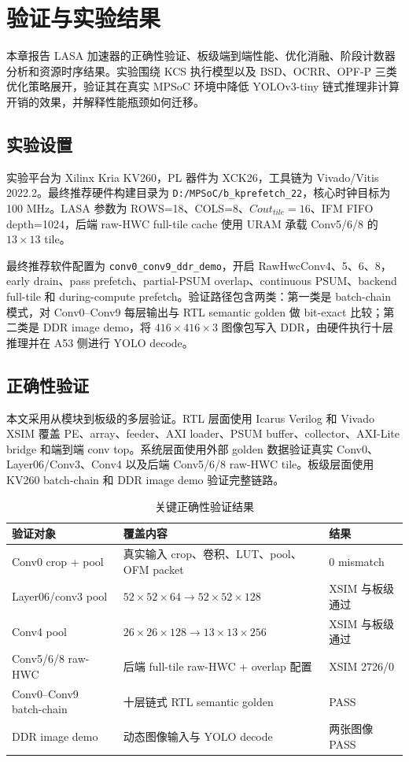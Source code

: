 \chapter{验证与实验结果}
\label{chap:results}

本章报告 LASA 加速器的正确性验证、板级端到端性能、优化消融、阶段计数器分析和资源时序结果。实验围绕 KCS 执行模型以及 BSD、OCRR、OPF-P 三类优化策略展开，验证其在真实 MPSoC 环境中降低 YOLOv3-tiny 链式推理非计算开销的效果，并解释性能瓶颈如何迁移。

\section{实验设置}

实验平台为 Xilinx Kria KV260，PL 器件为 XCK26，工具链为 Vivado/Vitis 2022.2。最终推荐硬件构建目录为 \texttt{D:/MPSoC/b\_kprefetch\_22}，核心时钟目标为 100 MHz。LASA 参数为 ROWS=18、COLS=8、$Cout_{tile}=16$、IFM FIFO depth=1024，后端 raw-HWC full-tile cache 使用 URAM 承载 Conv5/6/8 的 $13\times13$ tile。

最终推荐软件配置为 \texttt{conv0\_conv9\_ddr\_demo}，开启 RawHwcConv4、5、6、8，early drain、pass prefetch、partial-PSUM overlap、continuous PSUM、backend full-tile 和 during-compute prefetch。验证路径包含两类：第一类是 batch-chain 模式，对 Conv0--Conv9 每层输出与 RTL semantic golden 做 bit-exact 比较；第二类是 DDR image demo，将 $416\times416\times3$ 图像包写入 DDR，由硬件执行十层推理并在 A53 侧进行 YOLO decode。

\section{正确性验证}

本文采用从模块到板级的多层验证。RTL 层面使用 Icarus Verilog 和 Vivado XSIM 覆盖 PE、array、feeder、AXI loader、PSUM buffer、collector、AXI-Lite bridge 和端到端 conv top。系统层面使用外部 golden 数据验证真实 Conv0、Layer06/Conv3、Conv4 以及后端 Conv5/6/8 raw-HWC tile。板级层面使用 KV260 batch-chain 和 DDR image demo 验证完整链路。

\begin{table}[htb]
\centering
\caption{关键正确性验证结果}
\label{tab:correctness}
\begin{tabular}{p{}p{}p{}}
\toprule
验证对象 & 覆盖内容 & 结果 \\
\midrule
Conv0 crop + pool & 真实输入 crop、卷积、LUT、pool、OFM packet & 0 mismatch \\
Layer06/conv3 pool & $52\times52\times64 \rightarrow 52\times52\times128$ & XSIM 与板级通过 \\
Conv4 pool & $26\times26\times128 \rightarrow 13\times13\times256$ & XSIM 与板级通过 \\
Conv5/6/8 raw-HWC & 后端 full-tile raw-HWC + overlap 配置 & XSIM 2726/0 \\
Conv0--Conv9 batch-chain & 十层链式 RTL semantic golden & PASS \\
DDR image demo & 动态图像输入与 YOLO decode & 两张图像 PASS \\
\bottomrule
\end{tabular}
\end{table}

